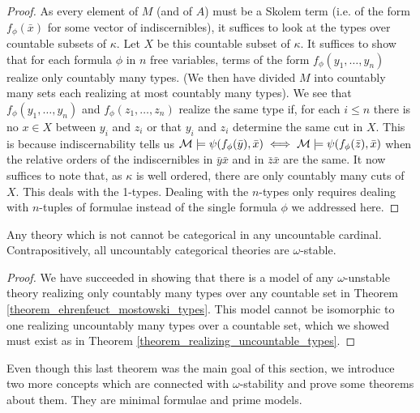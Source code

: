 \begin{proof}
As every element of \(M\) (and of \(A\)) must be a Skolem term (i.e. of the form \(f_\phi(\bar{x})\) for some vector of indiscernibles), it suffices to look at the types over countable subsets of \(\kappa\).
Let \(X\) be this countable subset of \(\kappa\). 
It suffices to show that for each formula \(\phi\) in \(n\) free variables, terms of the form \(f_\phi(y_1, \ldots, y_n)\) realize only countably many types. 
(We then have divided \(M\) into countably many sets each realizing at most countably many types).
We see that \(f_\phi(y_1, \ldots, y_n)\) and \(f_\phi(z_1, \ldots, z_n)\) realize the same type if, for each \(i \leq n\) there is no \(x \in X\) between \(y_i\) and \(z_i\) or that \(y_i\) and \(z_i\) determine the same cut in \(X\).  
This is because indiscernability tells us \(\mathcal{M} \models \psi(f_\phi(\bar{y}), \bar{x}) \iff \mathcal{M} \models \psi(f_\phi(\bar{z}), \bar{x})\) when the relative orders of the indiscernibles in \(\bar{y}\bar{x}\) and in \(\bar{z}\bar{x}\) are the same. 
It now suffices to note that, as \(\kappa\) is well ordered, there are only countably many cuts of \(X\). 
This deals with the 1-types. Dealing with the \(n\)-types only requires dealing with \(n\)-tuples of formulae instead of the single formula \(\phi\) we addressed here. 
\end{proof}

\begin{theorem}\label{theorem_omega_stability_categoricity}
Any theory which is not \omst cannot be categorical in any uncountable cardinal. Contrapositively, all uncountably categorical theories are \(\omega\)-stable.
\end{theorem}

\begin{proof}
We have succeeded in showing that there is a model of any \(\omega\)-unstable theory realizing only countably many types over any countable set in Theorem \ref{theorem_ehrenfeuct_mostowski_types}.
This model cannot be isomorphic to one realizing uncountably many types over a countable set, which we showed must exist as in Theorem \ref{theorem_realizing_uncountable_types}.
\end{proof}

Even though this last theorem was the main goal of this section, we introduce two more concepts which are connected with \(\omega\)-stability and prove some theorems about them. They are minimal formulae and prime models. 

